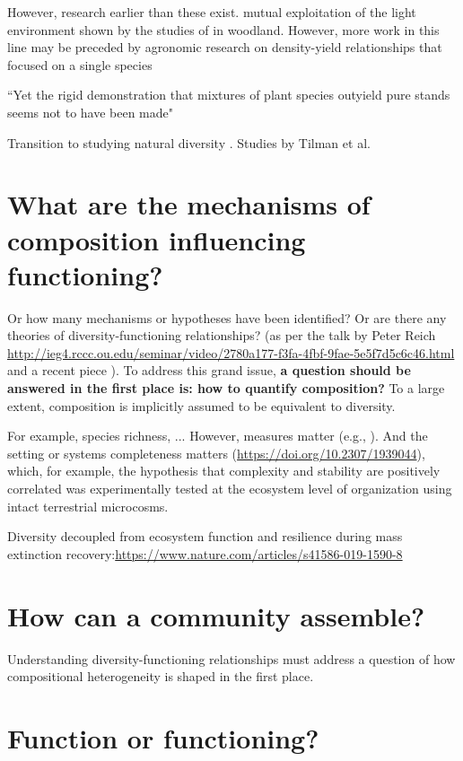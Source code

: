 \documentclass[letterpaper, 10pt]{article}
\begin{document}
However, research earlier than these exist. mutual exploitation of the light environment shown by the studies of \citet{salisbury1916oak} in woodland. However, more work in this line may be preceded by agronomic research on density-yield relationships that focused on a single species \citep{harperdarwinian} 

``Yet the rigid demonstration that mixtures of plant species outyield pure stands seems not to have been made" \citep{harperdarwinian}

Transition to studying natural diversity \citep{levin1999fragile}. Studies by Tilman et al. 


\section{What are the mechanisms of composition influencing functioning?}
Or how many mechanisms or hypotheses have been identified? Or are there any theories of diversity-functioning relationships? (as per the talk by Peter Reich \url{http://ieg4.rccc.ou.edu/seminar/video/2780a177-f3fa-4fbf-9fae-5e5f7d5c6c46.html} and a recent piece \citep{dunn2019biodiversity}). To address this grand issue, \textbf{a question should be answered in the first place is: how to quantify composition?} To a large extent, composition is implicitly assumed to be equivalent to diversity.

For example, species richness, ... However, measures matter (e.g., \citealp{schuldt2017belowground}). And the setting or systems completeness matters (\url{https://doi.org/10.2307/1939044}), which, for example, the hypothesis that complexity and stability are positively correlated was experimentally tested at the ecosystem level of organization using intact terrestrial microcosms.

Diversity decoupled from ecosystem function and resilience during mass extinction recovery:\url{https://www.nature.com/articles/s41586-019-1590-8}

\section{How can a community assemble?}
Understanding diversity-functioning relationships must address a question of how compositional heterogeneity is shaped in the first place.

\section{Function or functioning?}
\citep{jax2005function}
\end{document}
